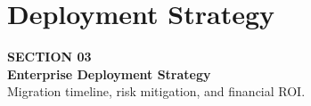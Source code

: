 \documentclass[aspectratio=169, 10pt]{beamer}
\begin{document}
\section{Deployment Strategy}
\label{sec:deployment}

\begin{frame}
  \vfill
  \begin{tcolorbox}[
    enhanced,
    colback=NavyDark,
    colframe=SkyAccent,
    boxrule=2pt,
    arc=6pt,
    top=14pt, bottom=14pt, left=14pt
  ]
    {\large\color{SkyAccent}\bfseries SECTION 03}\\[4pt]
    {\huge\bfseries\color{white} Enterprise Deployment Strategy}\\[6pt]
    {\small\color{PageBg!80!white} Migration timeline, risk mitigation, and financial ROI.}
  \end{tcolorbox}
  \vfill
\end{frame}

\end{document}
